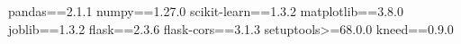pandas==2.1.1
numpy==1.27.0
scikit-learn==1.3.2
matplotlib==3.8.0
joblib==1.3.2
flask==2.3.6
flask-cors==3.1.3
setuptools>=68.0.0
kneed==0.9.0
